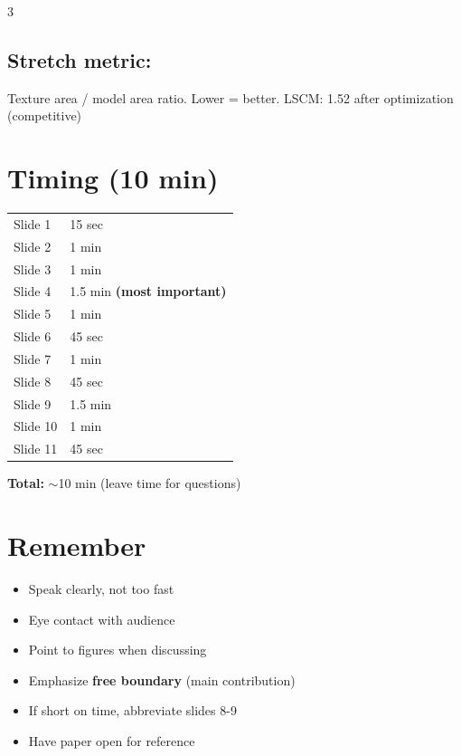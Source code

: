 \documentclass[10pt,landscape]{article}
\begin{document}
\begin{multicols}{3}
\subsection*{Stretch metric:}
Texture area / model area ratio. Lower = better. LSCM: 1.52 after optimization (competitive)

\section*{Timing (10 min)}
\begin{tabular}{ll}
Slide 1 & 15 sec\\
Slide 2 & 1 min\\
Slide 3 & 1 min\\
Slide 4 & 1.5 min \textbf{(most important)}\\
Slide 5 & 1 min\\
Slide 6 & 45 sec\\
Slide 7 & 1 min\\
Slide 8 & 45 sec\\
Slide 9 & 1.5 min\\
Slide 10 & 1 min\\
Slide 11 & 45 sec\\
\end{tabular}

\vspace{4pt}
\textbf{Total:} $\sim$10 min (leave time for questions)

\section*{Remember}
\begin{itemize}
\item Speak clearly, not too fast
\item Eye contact with audience
\item Point to figures when discussing
\item Emphasize \textbf{free boundary} (main contribution)
\item If short on time, abbreviate slides 8-9
\item Have paper open for reference
\end{itemize}

\end{multicols}
\end{document}
